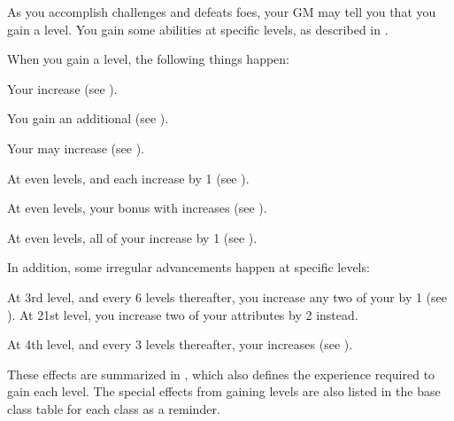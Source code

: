   As you accomplish challenges and defeats foes, your GM may tell you that you gain a level.
  You gain some abilities at specific levels, as described in .

  When you gain a level, the following things happen:
  \begin{raggeditemize}
    \item Your  increase (see ).
    \item You gain an additional  (see ).
    \item Your  may increase (see ).
    \item At even levels,  and  each increase by 1 (see ).
    \item At even levels, your bonus with  increases (see ).
    \item At even levels, all of your  increase by 1 (see ).
  \end{raggeditemize}

  In addition, some irregular advancements happen at specific levels:
  \begin{raggeditemize}
    \item At 3rd level, and every 6 levels thereafter, you increase any two of your  by 1 (see ).
      At 21st level, you increase two of your attributes by 2 instead.
    \item At 4th level, and every 3 levels thereafter, your  increases (see ).
  \end{raggeditemize}

  These effects are summarized in , which also defines the experience required to gain each level.
  The special effects from gaining levels are also listed in the base class table for each class as a reminder.


